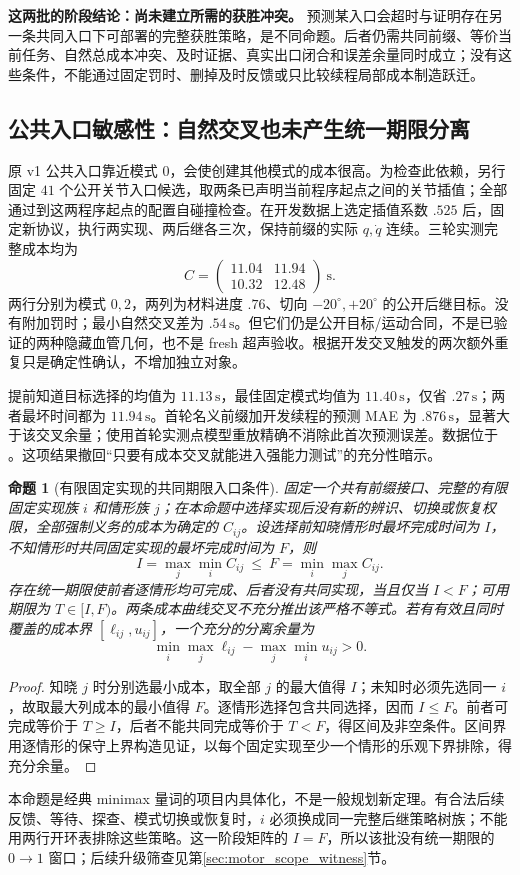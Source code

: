 \documentclass[11pt,a4paper,fontset=fandol]{ctexart}
\newtheorem{proposition}[theorem]{命题}
\theoremstyle{definition}
\theoremstyle{remark}\newtheorem{remark}[theorem]{说明}
\numberwithin{equation}{section}
\begin{document}
\textbf{这两批的阶段结论：尚未建立所需的获胜冲突。} 预测某入口会超时与证明存在另一条共同入口下可部署的完整获胜策略，是不同命题。后者仍需共同前缀、等价当前任务、自然总成本冲突、及时证据、真实出口闭合和误差余量同时成立；没有这些条件，不能通过固定罚时、删掉及时反馈或只比较续程局部成本制造跃迁。


\subsection{公共入口敏感性：自然交叉也未产生统一期限分离}
原 v1 公共入口靠近模式 $0$，会使创建其他模式的成本很高。为检查此依赖，另行固定 $41$ 个公开关节入口候选，取两条已声明当前程序起点之间的关节插值；全部通过到这两程序起点的配置自碰撞检查。在开发数据上选定插值系数 $.525$ 后，固定新协议，执行两实现、两后继各三次，保持前缀的实际 $q,\dot q$ 连续。三轮实测完整成本均为
\[
 C=\begin{pmatrix}11.04&11.94\\10.32&12.48\end{pmatrix}\ \mathrm{s}.
\]
两行分别为模式 $0,2$，两列为材料进度 $.76$、切向 $-20^\circ,+20^\circ$ 的公开后继目标。没有附加罚时；最小自然交叉差为 $.54\,\mathrm{s}$。但它们仍是公开目标/运动合同，不是已验证的两种隐藏血管几何，也不是 fresh 超声验收。根据开发交叉触发的两次额外重复只是确定性确认，不增加独立对象。

提前知道目标选择的均值为 $11.13\,\mathrm{s}$，最佳固定模式均值为 $11.40\,\mathrm{s}$，仅省 $.27\,\mathrm{s}$；两者最坏时间都为 $11.94\,\mathrm{s}$。首轮名义前缀加开发续程的预测 MAE 为 $.876\,\mathrm{s}$，显著大于该交叉余量；使用首轮实测点模型重放精确不消除此首次预测误差。数据位于 。这项结果撤回“只要有成本交叉就能进入强能力测试”的充分性暗示。

\begin{proposition}[有限固定实现的共同期限入口条件]
固定一个共有前缀接口、完整的有限固定实现族 $i$ 和情形族 $j$；在本命题中选择实现后没有新的辨识、切换或恢复权限，全部强制义务的成本为确定的 $C_{ij}$。设选择前知晓情形时最坏完成时间为 $I$，不知情形时共同固定实现的最坏完成时间为 $F$，则
\[
 I=\max_j\min_i C_{ij}\ \le\ F=\min_i\max_j C_{ij}.
\]
存在统一期限使前者逐情形均可完成、后者没有共同实现，当且仅当 $I<F$；可用期限为 $T\in[I,F)$。两条成本曲线交叉不充分推出该严格不等式。若有有效且同时覆盖的成本界 $[\ell_{ij},u_{ij}]$，一个充分的分离余量为
\[
 \min_i\max_j\ell_{ij}-\max_j\min_i u_{ij}>0.
\]
\end{proposition}
\begin{proof}
知晓 $j$ 时分别选最小成本，取全部 $j$ 的最大值得 $I$；未知时必须先选同一 $i$，故取最大列成本的最小值得 $F$。逐情形选择包含共同选择，因而 $I\le F$。前者可完成等价于 $T\ge I$，后者不能共同完成等价于 $T<F$，得区间及非空条件。区间界用逐情形的保守上界构造见证，以每个固定实现至少一个情形的乐观下界排除，得充分余量。
\end{proof}
本命题是经典 minimax 量词的项目内具体化，不是一般规划新定理。有合法后续反馈、等待、探查、模式切换或恢复时，$i$ 必须换成同一完整后继策略树族；不能用两行开环表排除这些策略。这一阶段矩阵的 $I=F$，所以该批没有统一期限的 $0\!\to\!1$ 窗口；后续升级筛查见第\ref{sec:motor_scope_witness}节。
\end{document}
